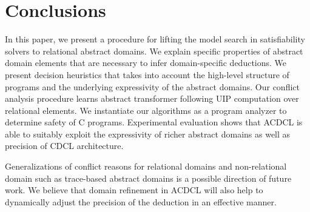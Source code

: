 \section{Conclusions}
In this paper, we present a procedure for lifting the model search 
in satisfiability solvers to relational abstract domains.  We explain 
specific properties of abstract domain elements that are necessary to infer 
domain-specific deductions.  We present decision heuristics that takes 
into account the high-level structure of programs and the underlying 
expressivity of the abstract domains.  Our conflict analysis procedure 
learns abstract transformer following UIP computation over relational 
elements.  We instantiate our algorithms as a program analyzer to determine
safety of C programs.  Experimental evaluation shows that ACDCL is able 
to suitably exploit the expressivity of richer abstract domains as well 
as precision of CDCL architecture.

Generalizations of conflict reasons for relational domains 
and non-relational domain such as trace-based abstract domains is a 
possible direction of future work.  We believe that domain refinement 
in ACDCL will also help to dynamically adjust the precision of the 
deduction in an effective manner. 


